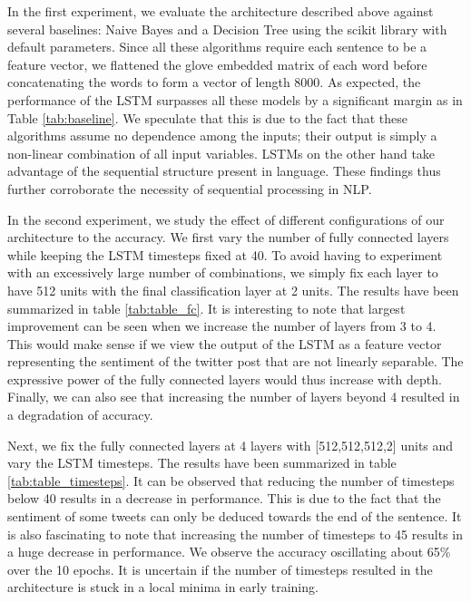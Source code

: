 \documentclass[10pt,conference,compsocconf]{IEEEtran}
\begin{document}
In the first experiment, we evaluate the architecture described above against several baselines: Naive Bayes and a Decision Tree using the scikit library \cite{sklearn} with default parameters. Since all these algorithms require each sentence to be a feature vector, we flattened the glove embedded matrix of each word before concatenating the words to form a vector of length 8000. As expected, the performance of the LSTM surpasses all these models by a significant margin as in Table \ref{tab:baseline}. We speculate that this is due to the fact that these algorithms assume no dependence among the inputs; their output is simply a non-linear combination of all input variables. LSTMs on the other hand take advantage of the sequential structure present in language. These findings thus further corroborate the necessity of sequential processing in NLP.


In the second experiment, we study the effect of different configurations of our architecture to the accuracy. We first vary the number of fully connected layers while keeping the LSTM timesteps fixed at 40. To avoid having to experiment with an excessively large number of combinations, we simply fix each layer to have 512 units with the final classification layer at 2 units. The results have been summarized in table \ref{tab:table_fc}. It is interesting to note that largest improvement can be seen when we increase the number of layers from 3 to 4. This would make sense if we view the output of the LSTM as a feature vector representing the sentiment of the twitter post that are not linearly separable. The expressive power of the fully connected layers would thus increase with depth. Finally, we can also see that increasing the number of layers beyond 4 resulted in a degradation of accuracy. 

Next, we fix the fully connected layers at 4 layers with [512,512,512,2] units and vary the LSTM timesteps. The results have been summarized in table \ref{tab:table_timesteps}. It can be observed that reducing the number of timesteps below 40 results in a decrease in performance. This is due to the fact that the sentiment of some tweets can only be deduced towards the end of the sentence. It is also fascinating to note that increasing the number of timesteps to 45 results in a huge decrease in performance. We observe the accuracy oscillating about 65\% over the 10 epochs. It is uncertain if the number of timesteps resulted in the architecture is stuck in a local minima in early training.
\end{document}
